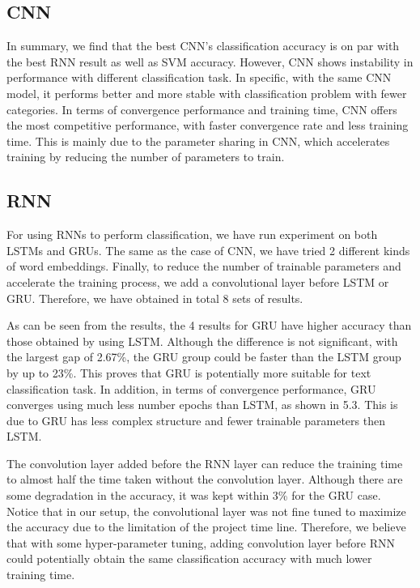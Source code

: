 \documentclass{article}
\begin{document}
\subsection{CNN}
In summary, we find that the best CNN’s classification accuracy is on par with the best RNN result as well as SVM accuracy. However, CNN shows instability in performance with different classification task. In specific, with the same CNN model, it performs better and more stable with classification problem with fewer categories. In terms of convergence performance and training time, CNN offers the most competitive performance, with faster convergence rate and less training time. This is mainly due to the parameter sharing in CNN, which accelerates training by reducing the number of parameters to train.


\subsection{RNN}
For using RNNs to perform classification, we have run experiment on both LSTMs and GRUs. The same as the case of CNN, we have tried 2 different kinds of word embeddings. Finally, to reduce the number of trainable parameters and accelerate the training process, we add a convolutional layer before LSTM or GRU. Therefore, we have obtained in total 8 sets of results.

As can be seen from the results, the 4 results for GRU have higher accuracy than those obtained by using LSTM. Although the difference is not significant, with the largest gap of 2.67\%, the GRU group could be faster than the LSTM group by up to  23\%. This proves that GRU is potentially more suitable for text classification task.  In addition, in terms of convergence performance, GRU converges using much less number epochs than LSTM, as shown in 5.3. This is due to GRU has less complex structure and fewer trainable parameters then LSTM.

The convolution layer added before the RNN layer can reduce the training time to almost half the time taken without the convolution layer. Although there are some degradation in the accuracy, it was kept within 3\% for the GRU case. Notice that  in our setup, the convolutional layer was not fine tuned to maximize the accuracy due to the limitation of the project time line. Therefore, we believe that with some hyper-parameter tuning, adding convolution layer before RNN could potentially obtain the same classification accuracy with much lower training time.
\end{document}
